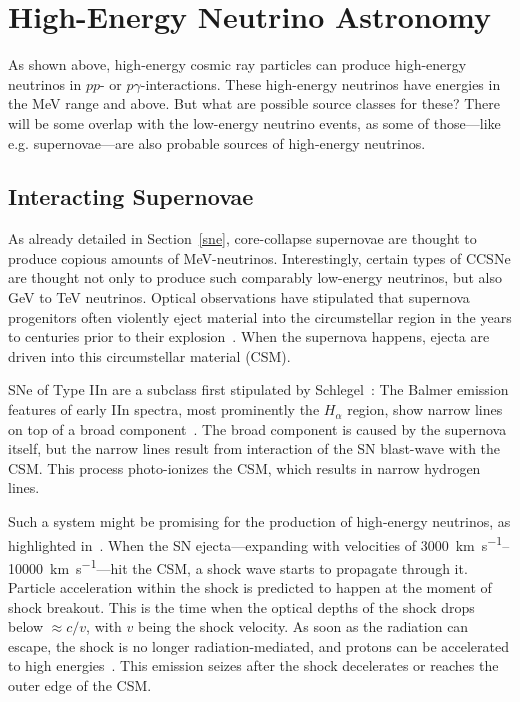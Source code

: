 \section{High-Energy Neutrino Astronomy}\label{he_neutrino_astronomy}

As shown above, high-energy cosmic ray particles can produce high-energy neutrinos in $pp$- or $p\gamma$-interactions. These high-energy neutrinos have energies in the \unit{\mega\eV} range and above. But what are possible source classes for these? There will be some overlap with the low-energy neutrino events, as some of those---like e.g. supernovae---are also probable sources of high-energy neutrinos.

\subsection{Interacting Supernovae}\label{interacting_sne}
As already detailed in Section~\ref{sne}, core-collapse supernovae are thought to produce copious amounts of \unit{\mega\eV}-neutrinos. Interestingly, certain types of CCSNe are thought not only to produce such comparably low-energy neutrinos, but also \unit{\giga\eV} to \unit{\tera\eV} neutrinos. Optical observations have stipulated that supernova progenitors often violently eject material into the circumstellar region in the years to centuries prior to their explosion~. When the supernova happens, ejecta are driven into this circumstellar material (CSM).

SNe of Type IIn are a subclass first stipulated by Schlegel~: The Balmer emission features of early IIn spectra, most prominently the $H_\alpha$ region, show narrow lines on top of a broad component~. The broad component is caused by the supernova itself, but the narrow lines result from interaction of the SN blast-wave with the CSM. This process photo-ionizes the CSM, which results in narrow hydrogen lines.

Such a system might be promising for the production of high-energy neutrinos, as highlighted in~. When the SN ejecta---expanding with velocities of \SIrange{3000}{10000}{\km\per\s}---hit the CSM, a shock wave starts to propagate through it. Particle acceleration within the shock is predicted to happen at the moment of shock breakout. This is the time when the optical depths of the shock drops below $\approx c/v$, with $v$ being the shock velocity. As soon as the radiation can escape, the shock is no longer radiation-mediated, and protons can be accelerated to high energies~. This emission seizes after the shock decelerates or reaches the outer edge of the CSM.

